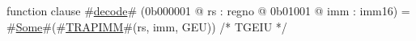 function clause #\hyperref[zdecode]{decode}# (0b000001 @ rs : regno @ 0b01001 @ imm : imm16) =
  #\hyperref[zSome]{Some}#(#\hyperref[zTRAPIMM]{TRAPIMM}#(rs, imm, GEU)) /* TGEIU */
